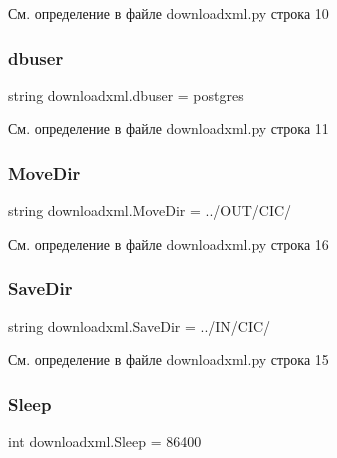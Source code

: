 См. определение в файле downloadxml.\+py строка 10

\mbox{\label{namespacedownloadxml_ae0187d21bda573cccc7c253c38ac9494}} 
\subsubsection{\texorpdfstring{dbuser}{dbuser}}
{\footnotesize\ttfamily string downloadxml.\+dbuser = \textquotesingle{}postgres\textquotesingle{}}



См. определение в файле downloadxml.\+py строка 11

\mbox{\label{namespacedownloadxml_ae93409e2d65411e5e0c56c338629a095}} 
\subsubsection{\texorpdfstring{Move\+Dir}{MoveDir}}
{\footnotesize\ttfamily string downloadxml.\+Move\+Dir = \textquotesingle{}../O\+UT/C\+IC/\textquotesingle{}}



См. определение в файле downloadxml.\+py строка 16

\mbox{\label{namespacedownloadxml_ac658e5e8b5ee862abc49621fce2f449a}} 
\subsubsection{\texorpdfstring{Save\+Dir}{SaveDir}}
{\footnotesize\ttfamily string downloadxml.\+Save\+Dir = \textquotesingle{}../IN/C\+IC/\textquotesingle{}}



См. определение в файле downloadxml.\+py строка 15

\mbox{\label{namespacedownloadxml_a664dcd7a63115699604c60cc1c94b6db}} 
\subsubsection{\texorpdfstring{Sleep}{Sleep}}
{\footnotesize\ttfamily int downloadxml.\+Sleep = 86400}



